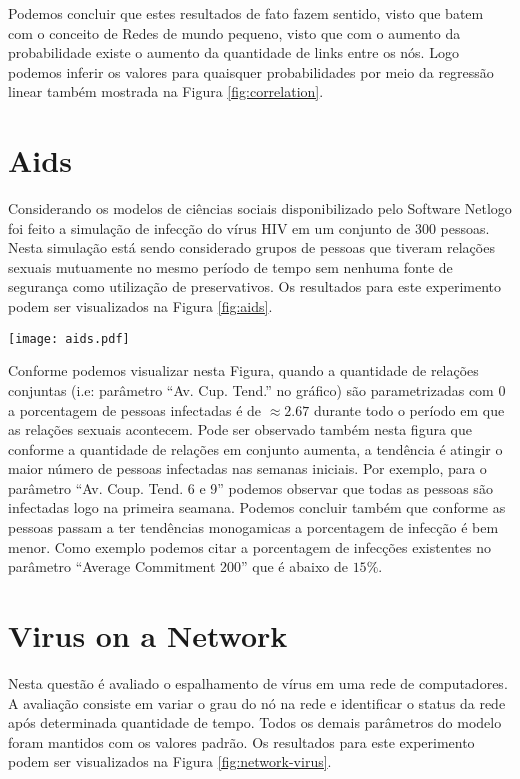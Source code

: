 \documentclass[12pt, a4paper]{article}
\begin{document}
Podemos concluir que estes resultados de fato fazem sentido, visto que batem com
o conceito de Redes de mundo pequeno, visto que com o aumento da probabilidade
existe o aumento da quantidade de links  entre os nós. Logo podemos inferir os 
valores para quaisquer probabilidades por meio da regressão linear também mostrada
na Figura \ref{fig:correlation}.



\section{Aids}
Considerando os modelos de ciências sociais disponibilizado pelo Software Netlogo
foi feito a simulação de infecção do vírus HIV em um conjunto de 300 pessoas. Nesta
simulação está sendo considerado grupos de pessoas que tiveram relações sexuais
mutuamente no mesmo período de tempo sem nenhuma fonte de segurança como utilização
de preservativos.
Os resultados para este experimento podem ser visualizados na Figura \ref{fig:aids}.

\begin{figure*}
  \centering
  \texttt{[image: aids.pdf]}
  \caption{Simulação do vírus HIV}
  \label{fig:aids}
\end{figure*}

Conforme podemos visualizar nesta Figura, quando a quantidade de relações conjuntas
(i.e: parâmetro ``Av. Cup. Tend.'' no gráfico) são parametrizadas com 0 a porcentagem
de pessoas infectadas é de $\approx 2.67$ durante todo o período em que as relações
sexuais acontecem. Pode ser observado também nesta figura que conforme a quantidade
de relações em conjunto aumenta, a tendência é atingir o maior número de pessoas
infectadas nas semanas iniciais. Por exemplo, para o parâmetro ``Av. Coup. Tend.
6 e 9'' podemos observar que todas as pessoas são infectadas logo na primeira seamana.
Podemos concluir também que conforme as pessoas passam a ter tendências monogamicas
a porcentagem de infecção é bem menor. Como exemplo podemos citar a porcentagem
de infecções existentes no parâmetro ``Average Commitment 200'' que é abaixo
de $15\%$.


\section{Virus on a Network}
Nesta questão é avaliado o espalhamento de vírus em uma rede de computadores.
A avaliação consiste em variar o grau do nó na rede e identificar o status da rede
após determinada quantidade de tempo. Todos os demais parâmetros do modelo foram
mantidos com os valores padrão. Os resultados para este experimento podem ser visualizados
na Figura \ref{fig:network-virus}. 
\end{document}
